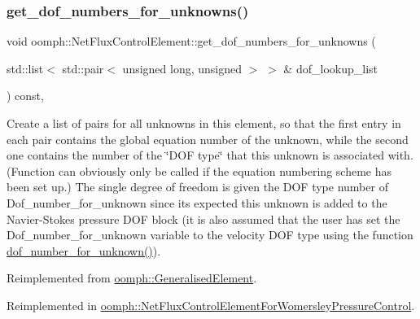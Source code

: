 \mbox{\label{classoomph_1_1NetFluxControlElement_ac4eedd635a016d29fd9e6da5ae0f8707}} 
\subsubsection{\texorpdfstring{get\+\_\+dof\+\_\+numbers\+\_\+for\+\_\+unknowns()}{get\_dof\_numbers\_for\_unknowns()}}
{\footnotesize\ttfamily void oomph\+::\+Net\+Flux\+Control\+Element\+::get\+\_\+dof\+\_\+numbers\+\_\+for\+\_\+unknowns (\begin{DoxyParamCaption}\item[{std\+::list$<$ std\+::pair$<$ unsigned long, unsigned $>$ $>$ \&}]{dof\+\_\+lookup\+\_\+list }\end{DoxyParamCaption}) const\hspace{0.3cm}{\ttfamily [inline]}, {\ttfamily [virtual]}}



Create a list of pairs for all unknowns in this element, so that the first entry in each pair contains the global equation number of the unknown, while the second one contains the number of the \char`\"{}\+D\+O\+F type\char`\"{} that this unknown is associated with. (Function can obviously only be called if the equation numbering scheme has been set up.) The single degree of freedom is given the D\+OF type number of Dof\+\_\+number\+\_\+for\+\_\+unknown since it\textquotesingle{}s expected this unknown is added to the Navier-\/\+Stokes pressure D\+OF block (it is also assumed that the user has set the Dof\+\_\+number\+\_\+for\+\_\+unknown variable to the velocity D\+OF type using the function \hyperlink{classoomph_1_1NetFluxControlElement_a43142408a4d2cea51b26d0c641bb0f51}{dof\+\_\+number\+\_\+for\+\_\+unknown()}). 



Reimplemented from \hyperlink{classoomph_1_1GeneralisedElement_a069f59bfc3e607a5bebba52c6314d777}{oomph\+::\+Generalised\+Element}.



Reimplemented in \hyperlink{classoomph_1_1NetFluxControlElementForWomersleyPressureControl_a63f6761cad384044fae2c8339422c9df}{oomph\+::\+Net\+Flux\+Control\+Element\+For\+Womersley\+Pressure\+Control}.




